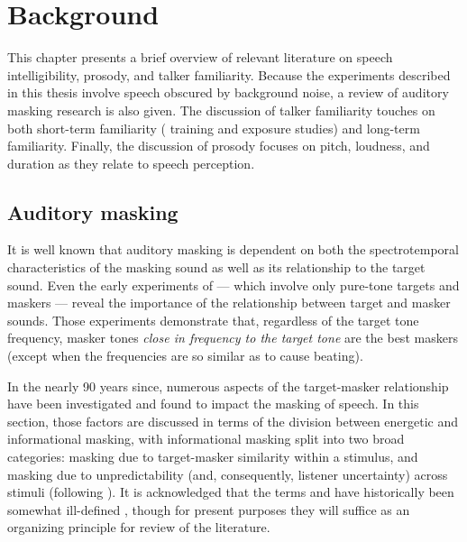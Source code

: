 \chapter{Background}
This chapter presents a brief overview of relevant literature on speech intelligibility, prosody, and talker familiarity.  Because the experiments described in this thesis involve speech obscured by background noise, a review of auditory masking research is also given.  The discussion of talker familiarity touches on both short-term familiarity (\ie{} training and exposure studies) and long-term familiarity.  Finally, the discussion of prosody focuses on pitch, loudness, and duration as they relate to speech perception.

\section{Auditory masking}
It is well known that auditory masking is dependent on both the spectrotemporal characteristics of the masking sound as well as its relationship to the target sound.  %
Even the early experiments of \citet{WegelLane1924} — which involve only pure-tone targets and maskers — reveal the importance of the relationship between target and masker sounds.  Those experiments demonstrate that, regardless of the target tone frequency, masker tones \emph{close in frequency to the target tone} are the best maskers (except when the frequencies are so similar as to cause beating).  

In the nearly 90 years since, numerous aspects of the target-masker relationship have been investigated and found to impact the masking of speech.  In this section, those factors are discussed in terms of the division between energetic and informational masking, with informational masking split into two broad categories: masking due to target-masker similarity within a stimulus, and masking due to unpredictability (and, consequently, listener uncertainty) across stimuli (following \citealt{KiddEtAl2002} \etseq).  It is acknowledged that the terms  and  have historically been somewhat ill-defined \citep[cf. discussions in][]{DurlachEtAl2003a, Watson2005}, though for present purposes they will suffice as an organizing principle for review of the literature.%

